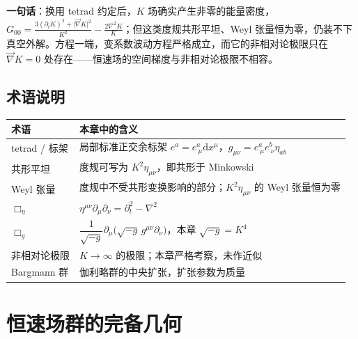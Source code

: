 \documentclass[
  chinese,
  a4paper,
  UTF8,
  12pt,
  oneside,
  openany]{ctexbook}
\newcounter{none} %
\theoremstyle{plain}
\theoremstyle{plain}
\theoremstyle{plain}
\theoremstyle{definition}
\theoremstyle{plain}
\theoremstyle{plain}
\theoremstyle{remark}
\begin{document}
\textbf{一句话}：换用 tetrad 约定后，\(K\)
场确实产生非零的能量密度，\(G_{00}=\frac{3(\partial_tK)^{2}+\lvert\vec\nabla K\rvert^{2}}{K^{2}}-\frac{2\nabla^{2}K}{K}\)；但这类度规共形平坦、Weyl
张量恒为零，仍装不下真空外解。方程一端，变系数波动方程严格成立，而它的非相对论极限只在
\(\vec\nabla K=0\) 处存在------恒速场的空间梯度与非相对论极限不相容。

\section{术语说明}\label{sec-isd-terms}

{\def\LTcaptype{none} %
\begin{longtable}[]{@{}
  >{\raggedright\arraybackslash}p{}
  >{\raggedright\arraybackslash}p{}@{}}
\toprule\noalign{}
\begin{minipage}[b]{\linewidth}\raggedright
术语
\end{minipage} & \begin{minipage}[b]{\linewidth}\raggedright
本章中的含义
\end{minipage} \\
\midrule\noalign{}
\endhead
\bottomrule\noalign{}
\endlastfoot
tetrad / 标架 & 局部标准正交余标架
\(e^{a}=e^{a}_{\ \mu}\mathrm{d}x^{\mu}\)，\(g_{\mu\nu}=e^{a}_{\ \mu}e^{b}_{\ \nu}\eta_{ab}\) \\
共形平坦 & 度规可写为 \(K^{2}\eta_{\mu\nu}\)，即共形于 Minkowski \\
Weyl 张量 & 度规中不受共形变换影响的部分；\(K^{2}\eta_{\mu\nu}\) 的 Weyl
张量恒为零 \\
\(\Box_\eta\) &
\(\eta^{\mu\nu}\partial_\mu\partial_\nu=\partial_t^{2}-\nabla^{2}\) \\
\(\Box_g\) &
\(\dfrac{1}{\sqrt{-g}}\partial_\mu\bigl(\sqrt{-g}\,g^{\mu\nu}\partial_\nu\bigr)\)，本章
\(\sqrt{-g}=K^{4}\) \\
非相对论极限 & \(K\to\infty\) 的极限；本章严格考察，未作近似 \\
Bargmann 群 & 伽利略群的中央扩张，扩张参数为质量 \\
\end{longtable}
}


\chapter{恒速场群的完备几何}\label{sec-invariant-speed-geometry}
\end{document}
